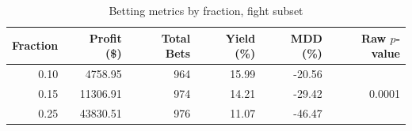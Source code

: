 \documentclass[12pt,twoside]{report}
\begin{document}
\begin{table}[!htb]
\centering
\begin{tabular}{rrrrrr} 
\toprule
Fraction & Profit (\$) & Total Bets & Yield (\%) & MDD (\%) & Raw $p$-value            \\ 
\toprule
0.10     & 4758.95     & 964        & 15.99      & -20.56   & \multirow{3}{*}{0.0001}  \\
0.15     & 11306.91    & 974        & 14.21      & -29.42   &                          \\
0.25     & 43830.51    & 976        & 11.07      & -46.47   &                          \\
\bottomrule
\end{tabular}
\caption{Betting metrics by fraction, fight subset}
\end{table}
\end{document}
